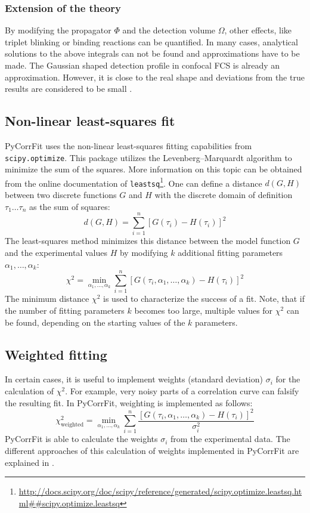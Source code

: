    \subsubsection{Extension of the theory}
	By modifying the propagator $\Phi$ and the detection volume $\Omega$, other effects, like triplet blinking or binding reactions can be quantified. In many cases, analytical solutions to the above integrals can not be found and approximations have to be made. The Gaussian shaped detection profile in confocal FCS is already an approximation. However, it is close to the real shape and deviations from the true results are considered to be small \cite{Zhang2007}.


\subsection{Non-linear least-squares fit}
\label{cha:PyCorFit_leastsq}
PyCorrFit uses the non-linear least-squares fitting capabilities from \texttt{scipy.optimize}. This package utilizes the Levenberg–Marquardt algorithm to minimize the sum of the squares. More information on this topic can be obtained from the online documentation of \texttt{leastsq}\footnote{\url{http://docs.scipy.org/doc/scipy/reference/generated/scipy.optimize.leastsq.html##scipy.optimize.leastsq}}. 
One can define a distance $d(G,H)$ between two discrete functions $G$ and $H$ with the discrete domain of definition $\tau_1 \dots \tau_n$ as the sum of squares:
\begin{equation}
d(G,H) = \sum_{i=1}^n \left[ G(\tau_i) - H(\tau_i) \right]^2
\end{equation}
The least-squares method minimizes this distance between the model function $G$ and the experimental values $H$ by modifying $k$ additional fitting parameters $\alpha_1, \dots, \alpha_k$:
\begin{equation}
\chi^2 = \min_{\alpha_1, \dots, \alpha_k} \sum_{i=1}^n \left[ G(\tau_i,\alpha_1, \dots, \alpha_k) - H(\tau_i) \right]^2
\end{equation}
The minimum distance $\chi^2$ is used to characterize the success of a fit. Note, that if the number of fitting parameters $k$ becomes too large, multiple values for $\chi^2$ can be found, depending on the starting values of the $k$ parameters.


\subsection{Weighted fitting}
In certain cases, it is useful to implement weights (standard deviation) $\sigma_i$ for the calculation of $\chi^2$. For example, very noisy parts of a correlation curve can falsify the resulting fit. In PyCorrFit, weighting is implemented as follows:
\begin{equation}
\chi^2_\mathrm{weighted} = \min_{\alpha_1, \dots, \alpha_k} \sum_{i=1}^n  \frac{\left[ G(\tau_i,\alpha_1, \dots, \alpha_k) - H(\tau_i) \right]^2}{\sigma_i^2}
\end{equation}
PyCorrFit is able to calculate the weights $\sigma_i$ from the experimental data. The different approaches of this calculation of weights implemented in PyCorrFit are explained in .



